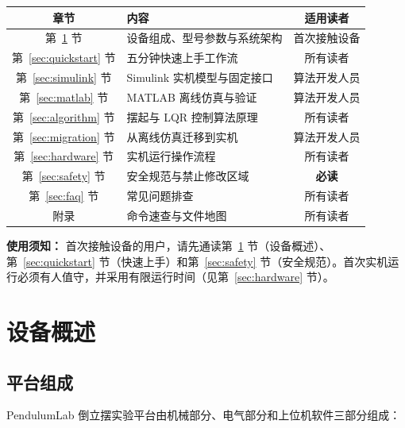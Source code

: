 \documentclass[12pt,a4paper]{article}
\begin{document}
\begin{center}
    \renewcommand{\arraystretch}{1.4}
    \begin{tabular}{@{}c p{8.9cm} c@{}}
        \toprule
        \textbf{章节} & \textbf{内容} & \textbf{适用读者} \\
        \midrule
        第~\ref{sec:overview} 节 & 设备组成、型号参数与系统架构 & 首次接触设备 \\
        第~\ref{sec:quickstart} 节 & 五分钟快速上手工作流 & 所有读者 \\
        第~\ref{sec:simulink} 节 & Simulink 实机模型与固定接口 & 算法开发人员 \\
        第~\ref{sec:matlab} 节 & MATLAB 离线仿真与验证 & 算法开发人员 \\
        第~\ref{sec:algorithm} 节 & 摆起与 LQR 控制算法原理 & 所有读者 \\
        第~\ref{sec:migration} 节 & 从离线仿真迁移到实机 & 算法开发人员 \\
        第~\ref{sec:hardware} 节 & 实机运行操作流程 & 所有读者 \\
        第~\ref{sec:safety} 节 & 安全规范与禁止修改区域 & \textbf{必读} \\
        第~\ref{sec:faq} 节 & 常见问题排查 & 所有读者 \\
        附录 & 命令速查与文件地图 & 所有读者 \\
        \bottomrule
    \end{tabular}
\end{center}

\begin{warnbox}
    \textbf{使用须知：} 首次接触设备的用户，请先通读第~\ref{sec:overview} 节（设备概述）、第~\ref{sec:quickstart} 节（快速上手）和第~\ref{sec:safety} 节（安全规范）。首次实机运行必须有人值守，并采用有限运行时间（见第~\ref{sec:hardware} 节）。
\end{warnbox}

\section{设备概述}
\label{sec:overview}

\subsection{平台组成}

PendulumLab 倒立摆实验平台由机械部分、电气部分和上位机软件三部分组成：
\end{document}
